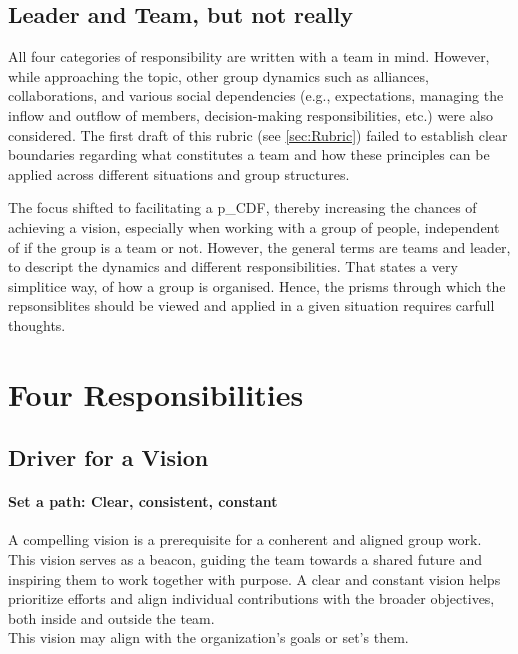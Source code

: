 \subsection{Leader and Team, but not really}

All four categories of responsibility are written with a team in mind. However, while approaching the topic, other group dynamics such as alliances, collaborations, and various social dependencies (e.g., expectations, managing the inflow and outflow of members, decision-making responsibilities, etc.) were also considered. The first draft of this rubric (see \ref{sec:Rubric}) failed to establish clear boundaries regarding what constitutes a team and how these principles can be applied across different situations and group structures.

The focus shifted to facilitating a \gls{p_CDF}, thereby increasing the chances of achieving a vision, especially when working with a group of people, independent of if the group is a team or not. However, the general terms are teams and leader, to descript the dynamics and different responsibilities. That states a very simplitice way, of how a group is organised. Hence, the prisms through which the repsonsiblites should be viewed and applied in a given situation requires carfull thoughts.

\section{Four Responsibilities}
\subsection{Driver for a Vision}\label{responsibility__driver}
\paragraph{Set a path: Clear, consistent, constant}

A compelling vision is a prerequisite for a conherent and aligned group work.\\

This vision serves as a beacon, guiding the team towards a shared future and inspiring them to work together with purpose. A clear and constant vision helps prioritize efforts and align individual contributions with the broader objectives, both inside and outside the team.\\

This vision may align with the organization's goals or set's them.\\

